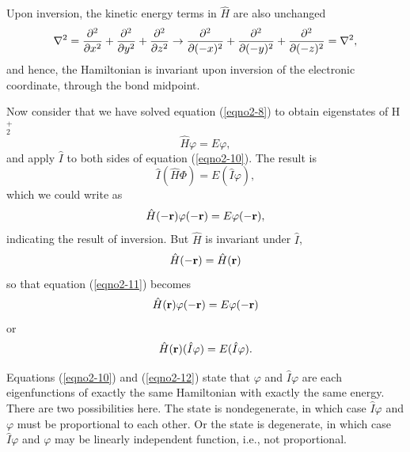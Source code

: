 Upon inversion, the kinetic energy terms in ${\hat H}$ are also unchanged
\begin{equation}
\nabla^2 = {\partial^2 \over \partial x^2} + {\partial^2 \over 
\partial y^2} + {\partial^2 \over \partial z^2} \rightarrow 
{\partial^2 \over \partial (-x)^2}  + {\partial^2 \over \partial 
(-y)^2} + {\partial^2 \over \partial (-z)^2} = \nabla^2,
\end{equation}
and hence, the Hamiltonian is invariant upon inversion of the electronic 
coordinate, through the bond midpoint.
    
Now consider that we have solved equation (\ref{eqno2-8}) to obtain
eigenstates of H$^+_2$
\begin{equation}
{\hat H} \varphi = E \varphi ,
\label{eqno2-10}
\end{equation}
and apply ${\hat I}$ to both sides of equation (\ref{eqno2-10}). The
result is
\begin{equation}
{\hat I} ( {\hat H} \Phi ) = E ( {\hat I} \varphi ) ,
\end{equation}
which we could write as
\begin{equation}
{\hat H} ( - {\bf r} ) \varphi (- {\bf r} ) = E \varphi ( - {\bf 
r} ),
\label{eqno2-11}
\end{equation}
indicating the result of inversion. But ${\hat H}$ is invariant 
under ${\hat I}$,
\begin{equation}
{\hat H}(-{\bf r}) = {\hat H} ({\bf r})
\end{equation}
so that equation (\ref{eqno2-11}) becomes
\begin{equation}
{\hat H} ( {\bf r} ) \varphi ( - {\bf r} ) = E \varphi ( - {\bf r} )
\end{equation}
or
\begin{equation}
{\hat H} ( {\bf r} ) ( {\hat I} \varphi ) = E ( {\hat I} \varphi 
).
\label{eqno2-12}
\end{equation}

Equations (\ref{eqno2-10}) and (\ref{eqno2-12}) state that $\varphi$
and ${\hat I} \varphi$ are each eigenfunctions of exactly the same
Hamiltonian with exactly the same energy. There are two possibilities
here. The state is nondegenerate, in which case ${\hat I} \varphi$ and
$\varphi$ must be proportional to each other. Or the state is
degenerate, in which case ${\hat I} \varphi$ and $\varphi$ may be
linearly independent function, i.e., not proportional.
    

